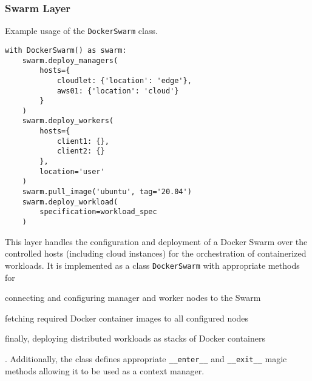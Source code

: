 \subsubsection{Swarm Layer}\label{sec:swarm}

\begin{listing}[tb]
\caption{Example usage of the \texttt{DockerSwarm} class.}\label{lst:swarm:example}
\begin{verbatim}
with DockerSwarm() as swarm:
    swarm.deploy_managers(
        hosts={
            cloudlet: {'location': 'edge'},
            aws01: {'location': 'cloud'}
        }
    )
    swarm.deploy_workers(
        hosts={
            client1: {},
            client2: {}
        },
        location='user'
    )
    swarm.pull_image('ubuntu', tag='20.04')
    swarm.deploy_workload(
        specification=workload_spec
    )
\end{verbatim}
\end{listing}
    

This layer handles the configuration and deployment of a Docker Swarm over the controlled hosts (including cloud instances) for the orchestration of containerized workloads.
It is implemented as a class \texttt{DockerSwarm} with appropriate methods for
\begin{enumerate*}[itemjoin={{; }}, itemjoin*={{; and }}]
    \item connecting and configuring manager and worker nodes to the Swarm
    \item fetching required Docker container images to all configured nodes
    \item finally, deploying distributed workloads as stacks of Docker containers
\end{enumerate*}.
Additionally, the class defines appropriate \texttt{__enter__} and \texttt{__exit__} magic methods allowing it to be used as a context manager.

